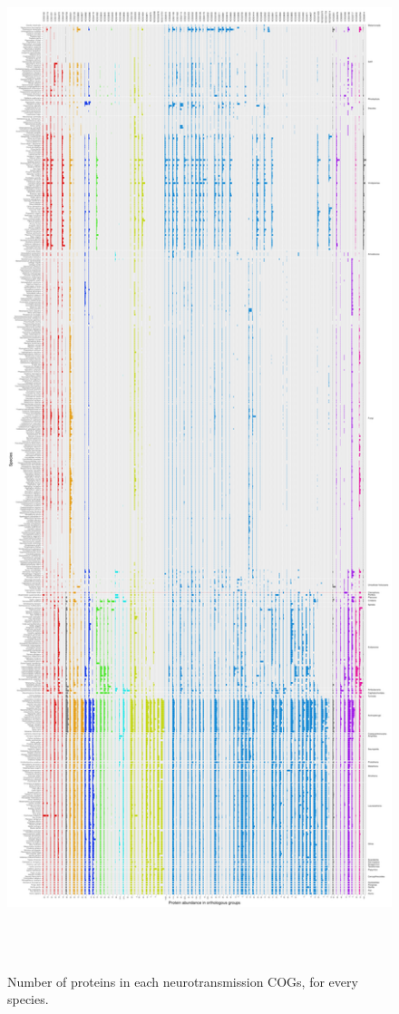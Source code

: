 \clearpage

\thispagestyle{empty}


\pdfpagewidth=15.8in \pdfpageheight=37in

\begin{figure}[p]

\caption{Number of proteins in each neurotransmission COGs, for every species.}\label{fig:all_abundances}

{\centering  \includegraphics[height=35in, width=15in]{figs/analysis.abundance.all_abundances-1} }

\end{figure}

\clearpage

\restoregeometry

\pdfpagewidth=8.5in \pdfpageheight=11in
